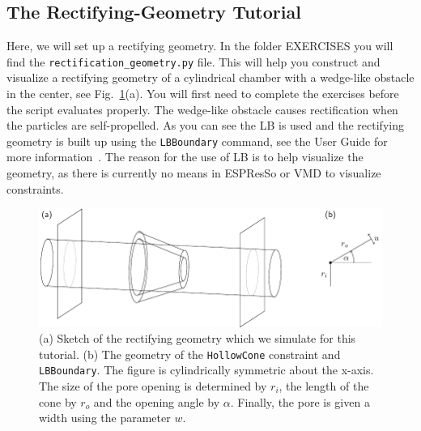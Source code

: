 \documentclass[aip,jcp,reprint,a4paper,onecolumn,amsmath]{revtex4-1}
\newcommand\code{\lstinline}
\newcommand{\es}{\mbox{\textsf{ESPResSo}}\xspace}
\newcommand\codees{\lstinline[language=python]}
\begin{document}
\subsection{\label{sub:rgtut}The Rectifying-Geometry Tutorial}

Here, we will set up a rectifying geometry. In the folder EXERCISES you will find the \code{rectification_geometry.py} file. This will help you construct and visualize a rectifying geometry of a cylindrical chamber with a wedge-like obstacle in the center, see Fig.~\ref{fig:system}(a). You will first need to complete the exercises before the script evaluates properly. The wedge-like obstacle causes rectification when the particles are self-propelled. As you can see the LB is used and the rectifying geometry is built up using the \codees{LBBoundary} command, see the User Guide for more information~\cite{UG}. The reason for the use of LB is to help visualize the geometry, as there is currently no means in \es{} or VMD to visualize constraints.

\begin{figure}[!htb]
\begin{center}
\includegraphics[scale=1.0]{FIGURES/geometry}
\end{center}
\caption{\label{fig:system}(a) Sketch of the rectifying geometry which we simulate for this tutorial. (b) The geometry of the \codees{HollowCone} constraint and \codees{LBBoundary}. The figure is cylindrically symmetric about the x-axis. The size of the pore opening is determined by $r_{i}$, the length of the cone by $r_{o}$ and the opening angle by $\alpha$. Finally, the pore is given a width using the parameter $w$.}
\end{figure}
\end{document}
